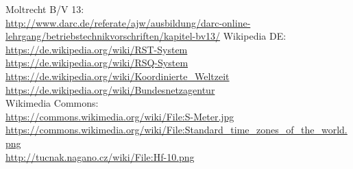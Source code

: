 \begin{thebibliography}{}

     Moltrecht B/V 13: \\
                    \url{http://www.darc.de/referate/ajw/ausbildung/darc-online-lehrgang/betriebstechnikvorschriften/kapitel-bv13/}
        Wikipedia DE: \\
                    \url{https://de.wikipedia.org/wiki/RST-System}\\
                    \url{https://de.wikipedia.org/wiki/RSQ-System}\\
                    \url{https://de.wikipedia.org/wiki/Koordinierte_Weltzeit}\\
                    \url{https://de.wikipedia.org/wiki/Bundesnetzagentur}\\
        Wikimedia Commons: \\
                    \url{https://commons.wikimedia.org/wiki/File:S-Meter.jpg}\\
                    \url{https://commons.wikimedia.org/wiki/File:Standard_time_zones_of_the_world.png}\\
      \url{http://tucnak.nagano.cz/wiki/File:Hf-10.png}\\
\end{thebibliography} 


